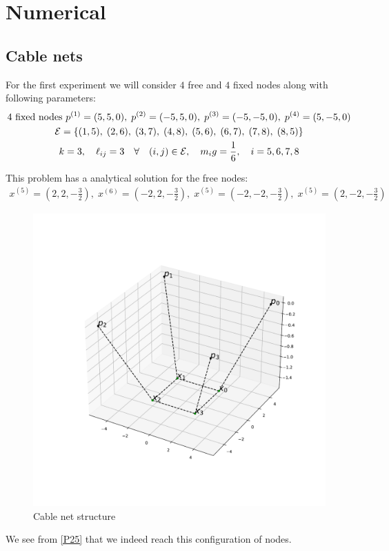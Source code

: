 \section{Numerical}

\subsection{Cable nets}
For the first experiment we will consider $4$ free and $4$ fixed nodes along with following parameters:
\begin{equation*}
\begin{gathered}
    4 \text{ fixed nodes } p^{(1)} = (5,5,0),\; p^{(2)} = (-5,5,0),\; p^{(3)} = (-5,-5,0),\; p^{(4)} = (5,-5,0) \\
    \mathcal{E} = \{(1,5),\;(2,6),\;(3,7),\;(4,8),\; (5,6),\; (6,7),\; (7,8),\; (8,5) \}\\
    k=3,\quad \ell_{ij} = 3 \quad \forall \quad (i,j) \in \mathcal{E}, \quad m_i g = \frac{1}{6}, \quad i= 5,6,7,8 
\end{gathered}
\end{equation*}

This problem has a analytical solution for the free nodes:
\begin{equation*}
    \begin{gathered}
    x^{(5)} = (2,2,-\frac{3}{2}),\;x^{(6)} = (-2,2,-\frac{3}{2}),\;x^{(5)} = (-2,-2,-\frac{3}{2}),\;x^{(5)} = (2,-2,-\frac{3}{2})
    \end{gathered}
\end{equation*}


\begin{figure}
    \centering
    \includegraphics[width=0.6\columnwidth]{Bilder/P25.pdf}
    \caption{Cable net structure}
    \label{P25}
\end{figure}
We see from \eqref{P25} that we indeed reach this configuration of nodes. 

